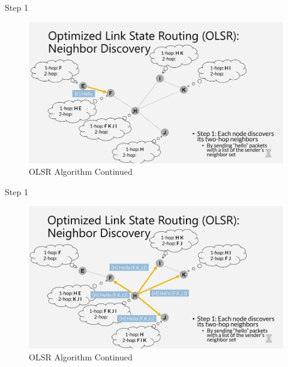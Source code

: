 \documentclass[11pt]{beamer}              %
\begin{document}
\begin{frame}{Step 1}

    \begin{figure}
        \centering
        \includegraphics[width=\textwidth]{figures/olsr6.png}
        \caption{OLSR Algorithm Continued \cite{coursera}}
    \end{figure}    
    
\end{frame}

\begin{frame}{Step 1}

    \begin{figure}
        \centering
        \includegraphics[width=\textwidth]{figures/olsr7.png}
        \caption{OLSR Algorithm Continued \cite{coursera}}
    \end{figure}    
    
\end{frame}
\end{document}
